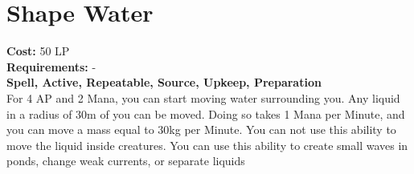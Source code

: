 \section{Shape Water}\label{spell:shapeWater}
\textbf{Cost:} 50 LP\\
\textbf{Requirements:} -\\
\textbf{Spell, Active, Repeatable, Source, Upkeep, Preparation}\\
For 4 AP and 2 Mana, you can start moving water surrounding you.
Any liquid in a radius of 30m of you can be moved.
Doing so takes 1 Mana per Minute, and you can move a mass equal to 30kg per Minute.
You can not use this ability to move the liquid inside creatures.
You can use this ability to create small waves in ponds, change weak currents, or separate liquids
